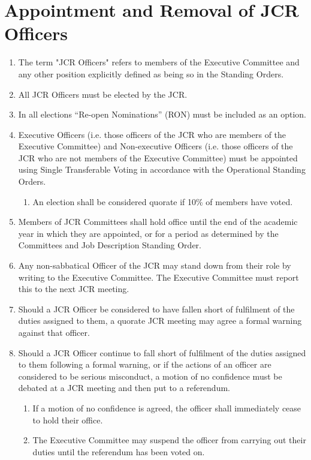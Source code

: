 \documentclass[12pt]{article}  %
\begin{document}
\newpage

\section{Appointment and Removal of JCR Officers}
\begin{enumerate}
    \item The term "JCR Officers" refers to members of the Executive Committee and any other position explicitly defined as being so in the Standing Orders.
    \item All JCR Officers must be elected by the JCR.
    \item In all elections “Re-open Nominations” (RON) must be included as an option.
    \item Executive Officers (i.e. those officers of the JCR who are members of the Executive Committee) and Non-executive Officers (i.e. those officers of the JCR who are not members of the Executive Committee) must be appointed using Single Transferable Voting in accordance with the Operational Standing Orders.
    \begin{enumerate}
        \item An election shall be considered quorate if 10\% of members have voted.
    \end{enumerate}
    \item Members of JCR Committees shall hold office until the end of the academic year in which they are appointed, or for a period as determined by the Committees and Job Description Standing Order.
    \item Any non-sabbatical Officer of the JCR may stand down from their role by writing to the Executive Committee. The Executive Committee must report this to the next JCR meeting.
    \item Should a JCR Officer be considered to have fallen short of fulfilment of the duties assigned to them, a quorate JCR meeting may agree a formal warning against that officer.
    \item Should a JCR Officer continue to fall short of fulfilment of the duties assigned to them following a formal warning, or if the actions of an officer are considered to be serious misconduct, a motion of no confidence must be debated at a JCR meeting and then put to a referendum.
    \begin{enumerate}
        \item If a motion of no confidence is agreed, the officer shall immediately cease to hold their office.
        \item The Executive Committee may suspend the officer from carrying out their duties until the referendum has been voted on.

\end{enumerate}
\end{enumerate}
\end{document}

